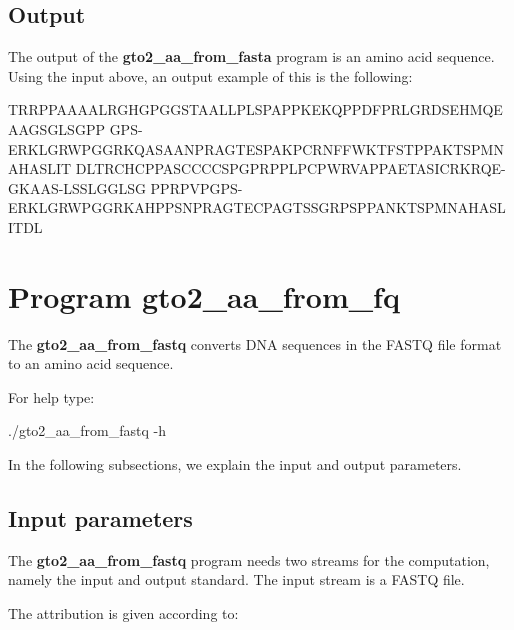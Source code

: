 \documentclass[11pt,]{krantz}
\newenvironment{Shaded}{\begin{snugshade}}{\end{snugshade}}
\newcommand{\ExtensionTok}[1]{#1}
\newcommand{\NormalTok}[1]{#1}
\begin{document}
\subsection*{Output}\label{output-29}


The output of the \textbf{gto2\_aa\_from\_fasta} program is an amino
acid sequence. Using the input above, an output example of this is the
following:

\begin{Shaded}
\begin{Highlighting}[]
\ExtensionTok{TRRPPAAAALRGHGPGGSTAALLPLSPAPPKEKQPPDFPRLGRDSEHMQEAAGSGLSGPP}
\ExtensionTok{GPS-ERKLGRWPGGRKQASAANPRAGTESPAKPCRNFFWKTFSTPPAKTSPMNAHASLIT}
\ExtensionTok{DLTRCHCPPASCCCCSPGPRPPLPCPWRVAPPAETASICRKRQE-GKAAS-LSSLGGLSG}
\ExtensionTok{PPRPVPGPS-ERKLGRWPGGRKAHPPSNPRAGTECPAGTSSGRPSPPANKTSPMNAHASL}
\ExtensionTok{ITDL}
\end{Highlighting}
\end{Shaded}

\section{Program gto2\_aa\_from\_fq}\label{program-gto2_aa_from_fq}

The \textbf{gto2\_aa\_from\_fastq} converts DNA sequences in the FASTQ
file format to an amino acid sequence.

For help type:

\begin{Shaded}
\begin{Highlighting}[]
\ExtensionTok{./gto2_aa_from_fastq}\NormalTok{ -h}
\end{Highlighting}
\end{Shaded}

In the following subsections, we explain the input and output
parameters.

\subsection*{Input parameters}\label{input-parameters-30}


The \textbf{gto2\_aa\_from\_fastq} program needs two streams for the
computation, namely the input and output standard. The input stream is a
FASTQ file.

The attribution is given according to:
\end{document}
